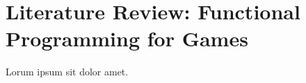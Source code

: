 \section{Literature Review: Functional Programming for Games}


Lorum ipsum sit dolor amet.  \lipsum[2-4]